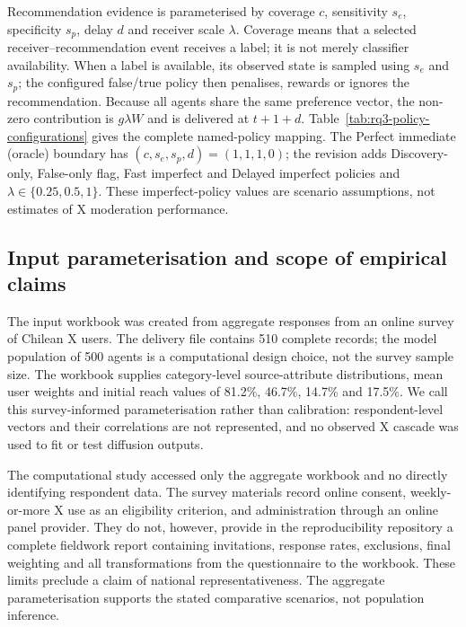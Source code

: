 Recommendation evidence is parameterised by coverage $c$, sensitivity $s_e$, specificity $s_p$, delay $d$ and receiver scale $\lambda$. Coverage means that a selected receiver--recommendation event receives a label; it is not merely classifier availability. When a label is available, its observed state is sampled using $s_e$ and $s_p$; the configured false/true policy then penalises, rewards or ignores the recommendation. Because all agents share the same preference vector, the non-zero contribution is $g\lambda W$ and is delivered at $t+1+d$. Table~\ref{tab:rq3-policy-configurations} gives the complete named-policy mapping. The Perfect immediate (oracle) boundary has $(c,s_e,s_p,d)=(1,1,1,0)$; the revision adds Discovery-only, False-only flag, Fast imperfect and Delayed imperfect policies and $\lambda\in\{0.25,0.5,1\}$. These imperfect-policy values are scenario assumptions, not estimates of X moderation performance.



\subsection{Input parameterisation and scope of empirical claims}

The input workbook was created from aggregate responses from an online survey of Chilean X users. The delivery file contains 510 complete records; the model population of 500 agents is a computational design choice, not the survey sample size. The workbook supplies category-level source-attribute distributions, mean user weights and initial reach values of 81.2\%, 46.7\%, 14.7\% and 17.5\%. We call this survey-informed parameterisation rather than calibration: respondent-level vectors and their correlations are not represented, and no observed X cascade was used to fit or test diffusion outputs.

The computational study accessed only the aggregate workbook and no directly identifying respondent data. The survey materials record online consent, weekly-or-more X use as an eligibility criterion, and administration through an online panel provider. They do not, however, provide in the reproducibility repository a complete fieldwork report containing invitations, response rates, exclusions, final weighting and all transformations from the questionnaire to the workbook. These limits preclude a claim of national representativeness. The aggregate parameterisation supports the stated comparative scenarios, not population inference.

